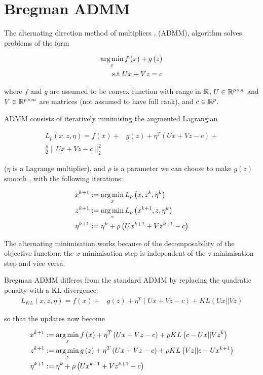\documentclass{article}
\begin{document}
\section{Bregman ADMM }\label{sec:admm}
The alternating direction method of multipliers \cite{Boyd2010a}, (ADMM), algorithm solves problems of the form

\begin{align}
\operatorname*{arg\,min}_{x} f\left( x \right) + g\left(z\right) \nonumber
\\
\text{s.t } Ux +Vz = c
\label{admm}
\end{align}

where \(f\) and \(g\) are assumed to be convex function with range in \({\mathbb{R}}\), \(U \in {\mathbb{R}}^{p \times n}\) and \(V\in {\mathbb{R}}^{p \times m}\) are matrices (not assumed to have full rank), and \(c \in {\mathbb{R}}^p\).

ADMM consists of iteratively minimising the augmented Lagrangian 

\begin{align*}
L_p\left(x, z, \eta\right) = f\left( x\right) +& g\left(z\right)+\eta^T\left(Ux+Vz-c\right) + \\ \frac{\rho}{2}\|Ux+Vz-c\|_2^2
\label{admm_form}
\end{align*}

(\(\eta\) is a Lagrange multiplier), and \(\rho\) is a parameter we can choose to make \(g(z)\) smooth \cite{nesterov2005smooth}, with the following iterations:

\begin{align}
x^{k+1} &:= \operatorname*{arg\,min}_{x} L_\rho\left(x,z^k,\eta^k\right)\\
z^{k+1} &:= \operatorname*{arg\,min}_{z} L_\rho\left(x^{k+1},z,\eta^k\right)\\
\eta^{k+1} &:= \eta^{k} + \rho \left(Ux^{k+1} + Vz^{k+1} - c\right)
\label{admm_algo}
\end{align}

The alternating minimisation works because of the decomposability of the objective function: the \(x\) minimisation step is independent of the \(z\) minimisation step and vice versa.  

Bregman ADMM differes from the standard ADMM by replacing the quadratic penalty with a KL divergence:
\begin{align*}
L_{KL}\left(x, z, \eta\right) = f\left( x\right) +& g\left(z\right)+\eta^T\left(Ux+Vz-c\right) + KL\left( Ux || Vz \right)
\label{admm_form}
\end{align*}

so that the updates now become

\begin{align}
x^{k+1} &:= \operatorname*{arg\,min}_{x} f\left(x\right) + \eta^T\left(Ux + Vz - c\right) + \rho KL\left(c-Ux || Vz^{k} \right) \\
z^{k+1} &:= \operatorname*{arg\,min}_{z} g\left(z\right) + \eta^T\left(Ux + Vz - c\right) + \rho KL\left(Vz || c-Ux^{k+1} \right)  \\
\eta^{k+1} &:= \eta^{k} + \rho \left(Ux^{k+1} + Vz^{k+1} - c\right)
\label{admm_algo}
\end{align}
\end{document}
